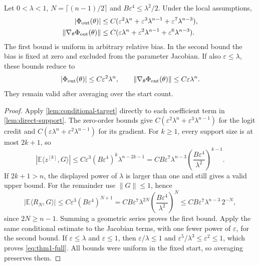 \begin{lemma}\label{lem:score-sum}
Let $0<\lambda<1$, $N=\lceil(n-1)/2\rceil$ and $B\varepsilon^4\le\lambda^2/2$. Under the local assumptions,
\begin{align*}
 |\Phi_{\mathrm{out}}(\theta)|&\le C(\varepsilon^2\lambda^n+\varepsilon^3\lambda^{n-1}+\varepsilon^7\lambda^{n-3}),\\
 \|\nabla_\theta\Phi_{\mathrm{out}}(\theta)\|&\le C(\varepsilon\lambda^n+\varepsilon^2\lambda^{n-1}+\varepsilon^6\lambda^{n-3}).
\end{align*}
The first bound is uniform in arbitrary relative bias. In the second bound the bias is fixed at zero and excluded from the parameter Jacobian. If also $\varepsilon\le\lambda$, these bounds reduce to
\begin{equation}
 |\Phi_{\mathrm{out}}(\theta)|\le C\varepsilon^2\lambda^n,\qquad
 \|\nabla_\theta\Phi_{\mathrm{out}}(\theta)\|\le C\varepsilon\lambda^n.
 \label{eq:thm1-full}
\end{equation}
They remain valid after averaging over the start count.
\end{lemma}
\begin{proof}
Apply \cref{lem:conditional-target} directly to each coefficient term in \cref{lem:direct-support}. The zero-order bounds give $C(\varepsilon^2\lambda^n+\varepsilon^3\lambda^{n-1})$ for the logit credit and $C(\varepsilon\lambda^n+\varepsilon^2\lambda^{n-1})$ for its gradient. For $k\ge1$, every support size is at most $2k+1$, so
\[
 |\mathbb E\langle z^{[k]},G\rangle|
 \le C\varepsilon^3(B\varepsilon^4)^k\lambda^{n-2k-1}
 = CB\varepsilon^7\lambda^{n-3}
 \left(\frac{B\varepsilon^4}{\lambda^2}\right)^{k-1}.
\]
If $2k+1>n$, the displayed power of $\lambda$ is larger than one and still gives a valid upper bound. For the remainder use $\|G\|\le1$, hence
\[
 |\mathbb E\langle R_N,G\rangle|
 \le C\varepsilon^3(B\varepsilon^4)^{N+1}
 =CB\varepsilon^7\lambda^{2N}
 \left(\frac{B\varepsilon^4}{\lambda^2}\right)^N
 \le CB\varepsilon^7\lambda^{n-3}\,2^{-N},
\]
since $2N\ge n-1$. Summing a geometric series proves the first bound. Apply the same conditional estimate to the Jacobian terms, with one fewer power of $\varepsilon$, for the second bound. If $\varepsilon\le\lambda$ and $\varepsilon\le1$, then $\varepsilon/\lambda\le1$ and $\varepsilon^5/\lambda^3\le\varepsilon^2\le1$, which proves \eqref{eq:thm1-full}. All bounds were uniform in the fixed start, so averaging preserves them.
\end{proof}

